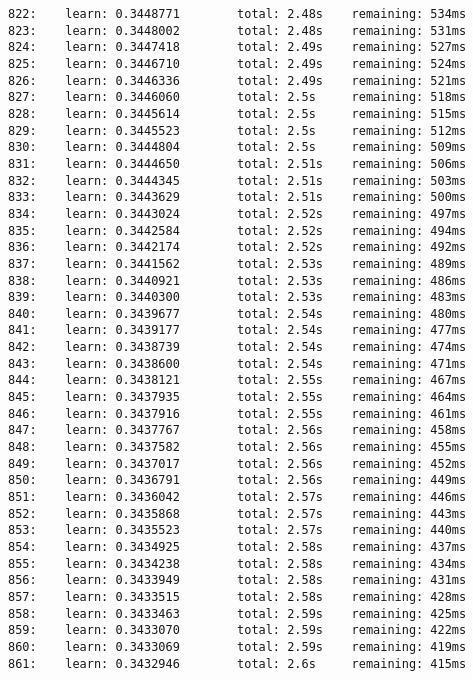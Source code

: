 \documentclass[11pt]{article}
\begin{document}
\begin{Verbatim}[commandchars=\\\{\}]
822:    learn: 0.3448771        total: 2.48s    remaining: 534ms
823:    learn: 0.3448002        total: 2.48s    remaining: 531ms
824:    learn: 0.3447418        total: 2.49s    remaining: 527ms
825:    learn: 0.3446710        total: 2.49s    remaining: 524ms
826:    learn: 0.3446336        total: 2.49s    remaining: 521ms
827:    learn: 0.3446060        total: 2.5s     remaining: 518ms
828:    learn: 0.3445614        total: 2.5s     remaining: 515ms
829:    learn: 0.3445523        total: 2.5s     remaining: 512ms
830:    learn: 0.3444804        total: 2.5s     remaining: 509ms
831:    learn: 0.3444650        total: 2.51s    remaining: 506ms
832:    learn: 0.3444345        total: 2.51s    remaining: 503ms
833:    learn: 0.3443629        total: 2.51s    remaining: 500ms
834:    learn: 0.3443024        total: 2.52s    remaining: 497ms
835:    learn: 0.3442584        total: 2.52s    remaining: 494ms
836:    learn: 0.3442174        total: 2.52s    remaining: 492ms
837:    learn: 0.3441562        total: 2.53s    remaining: 489ms
838:    learn: 0.3440921        total: 2.53s    remaining: 486ms
839:    learn: 0.3440300        total: 2.53s    remaining: 483ms
840:    learn: 0.3439677        total: 2.54s    remaining: 480ms
841:    learn: 0.3439177        total: 2.54s    remaining: 477ms
842:    learn: 0.3438739        total: 2.54s    remaining: 474ms
843:    learn: 0.3438600        total: 2.54s    remaining: 471ms
844:    learn: 0.3438121        total: 2.55s    remaining: 467ms
845:    learn: 0.3437935        total: 2.55s    remaining: 464ms
846:    learn: 0.3437916        total: 2.55s    remaining: 461ms
847:    learn: 0.3437767        total: 2.56s    remaining: 458ms
848:    learn: 0.3437582        total: 2.56s    remaining: 455ms
849:    learn: 0.3437017        total: 2.56s    remaining: 452ms
850:    learn: 0.3436791        total: 2.56s    remaining: 449ms
851:    learn: 0.3436042        total: 2.57s    remaining: 446ms
852:    learn: 0.3435868        total: 2.57s    remaining: 443ms
853:    learn: 0.3435523        total: 2.57s    remaining: 440ms
854:    learn: 0.3434925        total: 2.58s    remaining: 437ms
855:    learn: 0.3434238        total: 2.58s    remaining: 434ms
856:    learn: 0.3433949        total: 2.58s    remaining: 431ms
857:    learn: 0.3433515        total: 2.58s    remaining: 428ms
858:    learn: 0.3433463        total: 2.59s    remaining: 425ms
859:    learn: 0.3433070        total: 2.59s    remaining: 422ms
860:    learn: 0.3433069        total: 2.59s    remaining: 419ms
861:    learn: 0.3432946        total: 2.6s     remaining: 415ms

\end{Verbatim}
\end{document}
